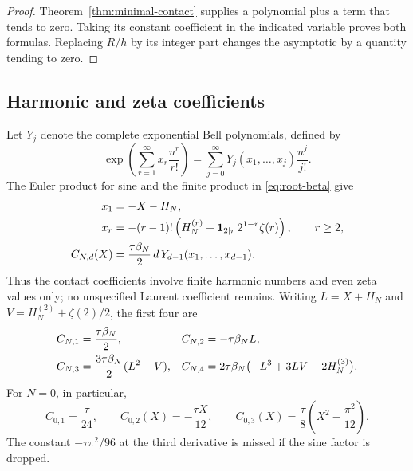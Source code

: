 \begin{proof}
Theorem~\ref{thm:minimal-contact} supplies a polynomial plus a term
that tends to zero. Taking its constant coefficient in the indicated
variable proves both formulas. Replacing \(R/h\) by its integer part
changes the asymptotic by a quantity tending to zero.
\end{proof}

\subsection{Harmonic and zeta coefficients}

Let \(Y_j\) denote the complete exponential Bell polynomials,
defined by
\[
 \exp\left(\sum_{r=1}^{\infty}x_r\frac{u^r}{r!}\right)
   =\sum_{j=0}^{\infty}Y_j(x_1,\ldots,x_j)\frac{u^j}{j!}.
\]
The Euler product for sine and the finite product in
\eqref{eq:root-beta} give
\begin{align}
 x_1&=-X-H_N,\notag\\
 x_r&=-(r-1)!\left(H_N^{(r)}
                +\mathbf1_{2\mid r}\,2^{1-r}\zeta(r)\right),
                  \qquad r\geq2,\label{eq:contact-bell}\\
 C_{N,d}(X)&=\frac{\tau\beta_N}{2}\,d\,
       Y_{d-1}(x_1,\ldots,x_{d-1}).\label{eq:contact-bell-value}
\end{align}
Thus the contact coefficients involve finite harmonic numbers and
even zeta values only; no unspecified Laurent coefficient remains.
Writing \(L=X+H_N\) and
\(V=H_N^{(2)}+\zeta(2)/2\), the first four are
\begin{align}
 C_{N,1}&=\frac{\tau\beta_N}{2},&
 C_{N,2}&=-\tau\beta_N L,\notag\\
 C_{N,3}&=\frac{3\tau\beta_N}{2}(L^2-V),&
 C_{N,4}&=2\tau\beta_N
       \bigl(-L^3+3LV-2H_N^{(3)}\bigr).
 \label{eq:first-four-contacts}
\end{align}
For \(N=0\), in particular,
\begin{equation}\label{eq:gamma-cubic-contact}
 C_{0,1}=\frac{\tau}{24},\qquad
 C_{0,2}(X)=-\frac{\tau X}{12},\qquad
 C_{0,3}(X)=\frac{\tau}{8}
                    \left(X^2-\frac{\pi^2}{12}\right).
\end{equation}
The constant \(-\tau\pi^2/96\) at the third derivative is missed
if the sine factor is dropped.

